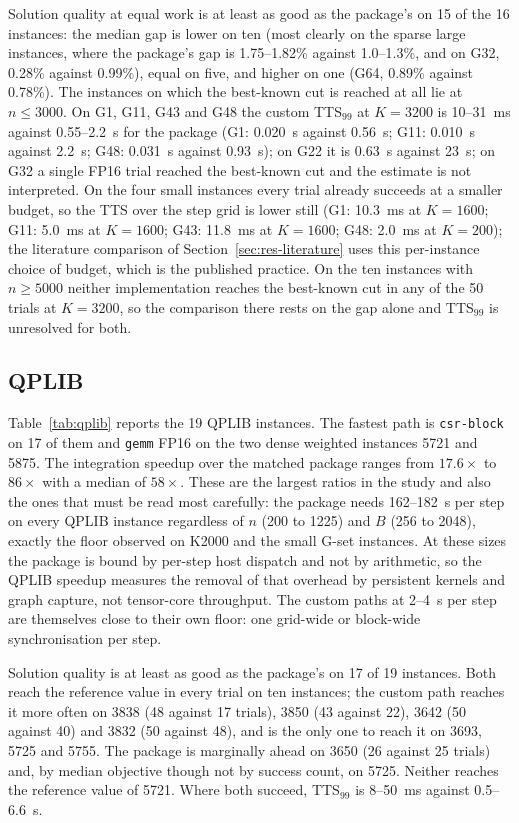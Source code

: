 \documentclass[11pt,a4paper]{article}
\newcommand{\code}[1]{\texttt{#1}}
\begin{document}
Solution quality at equal work is at least as good as the package's on 15 of the 16 instances: the median gap is lower on ten (most clearly on the sparse large instances, where the package's gap is 1.75--1.82\% against 1.0--1.3\%, and on G32, 0.28\% against 0.99\%), equal on five, and higher on one (G64, 0.89\% against 0.78\%). The instances on which the best-known cut is reached at all lie at $n\le3000$. On G1, G11, G43 and G48 the custom TTS$_{99}$ at $K=3200$ is 10--31~ms against 0.55--2.2~s for the package (G1: 0.020~s against 0.56~s; G11: 0.010~s against 2.2~s; G48: 0.031~s against 0.93~s); on G22 it is 0.63~s against 23~s; on G32 a single FP16 trial reached the best-known cut and the estimate is not interpreted. On the four small instances every trial already succeeds at a smaller budget, so the TTS over the step grid is lower still (G1: 10.3~ms at $K=1600$; G11: 5.0~ms at $K=1600$; G43: 11.8~ms at $K=1600$; G48: 2.0~ms at $K=200$); the literature comparison of Section~\ref{sec:res-literature} uses this per-instance choice of budget, which is the published practice. On the ten instances with $n\ge5000$ neither implementation reaches the best-known cut in any of the 50 trials at $K=3200$, so the comparison there rests on the gap alone and TTS$_{99}$ is unresolved for both.

\subsection{QPLIB}\label{sec:res-qplib}
Table~\ref{tab:qplib} reports the 19 QPLIB instances. The fastest path is \code{csr-block} on 17 of them and \code{gemm} FP16 on the two dense weighted instances 5721 and 5875. The integration speedup over the matched package ranges from $17.6\times$ to $86\times$ with a median of $58\times$. These are the largest ratios in the study and also the ones that must be read most carefully: the package needs 162--182~\textmu s per step on every QPLIB instance regardless of $n$ (200 to 1225) and $B$ (256 to 2048), exactly the floor observed on K2000 and the small G-set instances. At these sizes the package is bound by per-step host dispatch and not by arithmetic, so the QPLIB speedup measures the removal of that overhead by persistent kernels and graph capture, not tensor-core throughput. The custom paths at 2--4~\textmu s per step are themselves close to their own floor: one grid-wide or block-wide synchronisation per step.

Solution quality is at least as good as the package's on 17 of 19 instances. Both reach the reference value in every trial on ten instances; the custom path reaches it more often on 3838 (48 against 17 trials), 3850 (43 against 22), 3642 (50 against 40) and 3832 (50 against 48), and is the only one to reach it on 3693, 5725 and 5755. The package is marginally ahead on 3650 (26 against 25 trials) and, by median objective though not by success count, on 5725. Neither reaches the reference value of 5721. Where both succeed, TTS$_{99}$ is 8--50~ms against 0.5--6.6~s.
\end{document}
